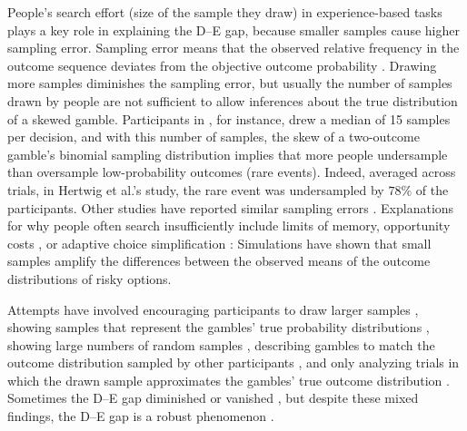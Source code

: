 \documentclass[a4paper, man, natbib, floatsintext]{apa6}
\begin{document}
People's search effort (size of the sample they draw) in experience-based tasks plays a key role in explaining the D--E gap, because smaller samples cause higher sampling error. Sampling error means that the observed relative frequency in the outcome sequence deviates from the objective outcome probability \citep{Hadar2009}. Drawing more samples diminishes the sampling error, but usually the number of samples drawn by people are not sufficient to allow inferences about the true distribution of a skewed gamble. Participants in \cite{Hertwig2004}, for instance, drew a median of 15 samples per decision, and with this number of samples, the skew of a two-outcome gamble's binomial sampling distribution implies that more people undersample than oversample  low-probability outcomes (rare events). Indeed, averaged across trials, in Hertwig et al.'s study, the rare event was undersampled by $78\%$ of the participants. Other studies have reported similar sampling errors \citep[e.g.,][]{Hau2008,Rakow2008}. Explanations for why people often search insufficiently include limits of memory, opportunity costs \citep{Hau2008}, or adaptive choice simplification \citep{Hertwig2010}: Simulations have shown that small samples amplify the differences between the observed means of the outcome distributions of risky options.

 Attempts have involved encouraging participants to draw larger samples \citep{Hau2008}, showing samples that represent the gambles' true probability distributions \citep{Ungemach2009}, showing large numbers of random samples \citep{Hau2008,Hau2010}, describing gambles to match the outcome distribution sampled by other participants  \citep{Rakow2008}, and only analyzing trials in which the drawn sample approximates the gambles' true outcome distribution \citep[e.g.,][]{Camilleri2009, Camilleri2011a}. Sometimes the D--E gap diminished \citep{Hau2008,Hau2010, Ungemach2009} or vanished \citep{Gloeckner2012, Camilleri2009,Camilleri2011a,Rakow2008}, but despite these mixed findings, the D--E gap is a robust phenomenon \citep[for a recent meta-analysis, see][]{Wulff2017}. 

\end{document}
